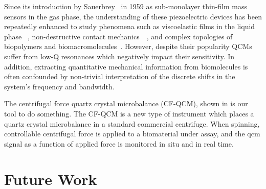 Since its introduction by Sauerbrey~\cite{sauerbrey1959verwendung} in 1959
as sub-monolayer thin-film mass sensors in the gas phase, the understanding
of these piezoelectric devices has been repeatedly enhanced to study
phenomena such as viscoelastic films in the liquid
phase~\cite{kanazawa1985frequency} , non-destructive contact
mechanics~\cite{borovsky2001measuring}~\cite{johannsman2007contacts}, and
complex topologies of biopolymers and
biomacromolecules~\cite{marx2003quartz}. However, despite their popularity
QCMs suffer from low-Q resonances which negatively impact their
sensitivity. In addition, extracting quantitative mechanical information
from biomolecules is often confounded by non-trivial interpretation of the
discrete shifts in the system's frequency and bandwidth.

The centrifugal force quartz crystal microbalance (CF-QCM), shown in
 is our tool to do something.  The CF-QCM is a new type
of instrument which places a quartz crystal microbalance in a standard
commercial centrifuge.  When spinning, controllable centrifugal force is
applied to a biomaterial under assay, and the \gls{qcm} signal as a function of
applied force is monitored in situ and in real time.

\chapter{Future Work}
